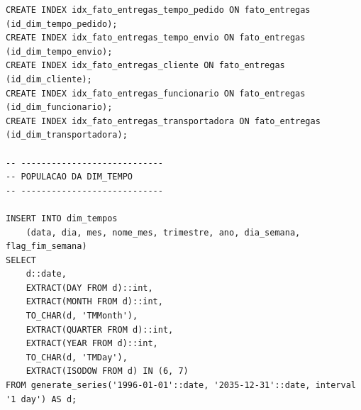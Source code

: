{\begin{verbatim}
CREATE INDEX idx_fato_entregas_tempo_pedido ON fato_entregas (id_dim_tempo_pedido);
CREATE INDEX idx_fato_entregas_tempo_envio ON fato_entregas (id_dim_tempo_envio);
CREATE INDEX idx_fato_entregas_cliente ON fato_entregas (id_dim_cliente);
CREATE INDEX idx_fato_entregas_funcionario ON fato_entregas (id_dim_funcionario);
CREATE INDEX idx_fato_entregas_transportadora ON fato_entregas (id_dim_transportadora);

-- ----------------------------
-- POPULACAO DA DIM_TEMPO
-- ----------------------------

INSERT INTO dim_tempos
    (data, dia, mes, nome_mes, trimestre, ano, dia_semana, flag_fim_semana)
SELECT
    d::date,
    EXTRACT(DAY FROM d)::int,
    EXTRACT(MONTH FROM d)::int,
    TO_CHAR(d, 'TMMonth'),
    EXTRACT(QUARTER FROM d)::int,
    EXTRACT(YEAR FROM d)::int,
    TO_CHAR(d, 'TMDay'),
    EXTRACT(ISODOW FROM d) IN (6, 7)
FROM generate_series('1996-01-01'::date, '2035-12-31'::date, interval '1 day') AS d;
\end{verbatim}
}
